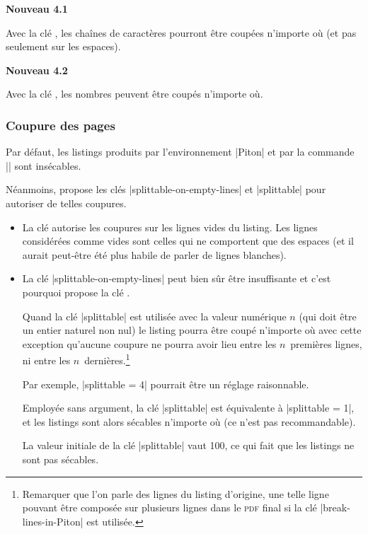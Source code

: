 \documentclass[dvipsnames,svgnames]{article}
\begin{document}
\bigskip
\colorbox{yellow!50}{\bfseries{Nouveau 4.1}}\par\nobreak

\smallskip
Avec la clé , les chaînes de caractères pourront être
coupées n'importe où (et pas seulement sur les espaces). 


\bigskip
\colorbox{yellow!50}{\bfseries{Nouveau 4.2}}\par\nobreak

\smallskip
Avec la clé , les nombres peuvent être coupés n'importe où.


\subsubsection{Coupure des pages}

\label{coupure-de-pages}


Par défaut, les listings produits par l'environnement |{Piton}| et par la commande
|\PitonInputFile| sont insécables.


Néanmoins,  propose les clés |splittable-on-empty-lines| et |splittable| pour
autoriser de telles coupures.

\begin{itemize}
\item La clé  autorise les coupures sur les lignes
vides du listing. Les lignes considérées comme vides sont celles qui ne comportent que des
espaces (et il aurait peut-être été plus habile de parler de lignes blanches). 

\medskip
\item La clé |splittable-on-empty-lines| peut bien sûr être insuffisante et c'est pourquoi
 propose la clé .

Quand la clé |splittable| est utilisée avec la valeur numérique $n$ (qui doit être un
entier naturel non nul) le listing pourra être coupé n'importe où avec cette exception
qu'aucune coupure ne pourra avoir lieu entre les $n$~premières lignes, ni entre les
$n$~dernières.\footnote{Remarquer que l'on parle des lignes du listing d'origine, une
  telle ligne pouvant être composée sur plusieurs lignes dans le \textsc{pdf} final si la
  clé |break-lines-in-Piton| est utilisée.}

Par exemple, |splittable = 4| pourrait être un réglage raisonnable.

Employée sans argument, la clé |splittable| est équivalente à |splittable = 1|, et les
listings sont alors sécables n'importe où (ce n'est pas recommandable).

La valeur initiale de la clé |splittable| vaut 100, ce qui fait que les listings ne sont
pas sécables. 
\end{itemize}
\end{document}
